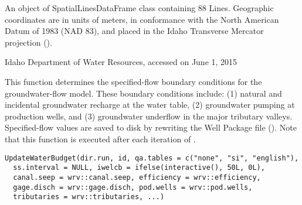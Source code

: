 \documentclass[a4paper]{book}
\begin{document}
%
\begin{Format}
An object of SpatialLinesDataFrame class containing 88 Lines.
Geographic coordinates are in units of meters, in conformance with the
North American Datum of 1983 (NAD 83), and placed in the
Idaho Transverse Mercator projection ().
\end{Format}
%
\begin{Source}\relax
Idaho Department of Water Resources, accessed on June 1, 2015
\end{Source}
%
\begin{Examples}
\end{Examples}
%
\begin{Description}\relax
This function determines the specified-flow boundary conditions for the groundwater-flow model.
These boundary conditions include:
(1) natural and incidental groundwater recharge at the water table,
(2) groundwater pumping at production wells, and
(3) groundwater underflow in the major tributary valleys.
Specified-flow values are saved to disk by rewriting the
 Well Package file ().
Note that this function is executed after each iteration of .
\end{Description}
%
\begin{Usage}
\begin{verbatim}
UpdateWaterBudget(dir.run, id, qa.tables = c("none", "si", "english"),
  ss.interval = NULL, iwelcb = ifelse(interactive(), 50L, 0L),
  canal.seep = wrv::canal.seep, efficiency = wrv::efficiency,
  gage.disch = wrv::gage.disch, pod.wells = wrv::pod.wells,
  tributaries = wrv::tributaries, ...)
\end{verbatim}
\end{Usage}
%
\end{document}
